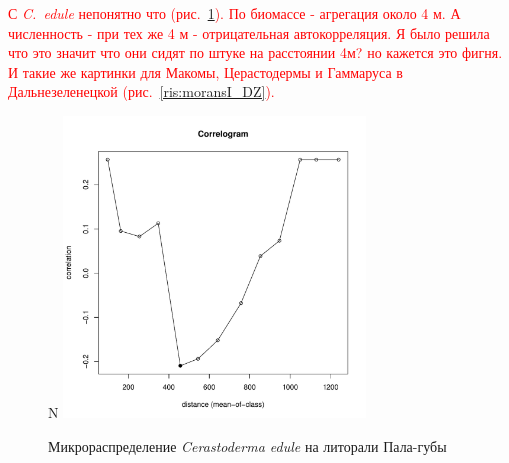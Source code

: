 \textcolor{red}{С {\it C.~edule} непонятно что (рис.~\ref{ris:moransI_Pala_Cerastoderma}). По биомассе - агрегация около 4 м. А численность - при тех же 4 м - отрицательная автокорреляция. Я было решила что это значит что они сидят по штуке на расстоянии 4м? но кажется это фигня. И такие же картинки для Макомы, Церастодермы и Гаммаруса в Дальнезеленецкой (рис.~\ref{ris:moransI_DZ}).}

	\begin{figure}[h]
	\begin{minipage}[b]{.5\linewidth}
	\begin{center}
	{\small N}
		\includegraphics[width=80mm]{../Barenc_Sea/distribution_Moran/Pala_moran_N_Cerastoderma_edule_.pdf}
	\end{center}
	\end{minipage}

	\caption{Микрораспределение {\it Cerastoderma edule} на литорали Пала-губы}
	\label{ris:moransI_Pala_Cerastoderma}
	\end{figure}



